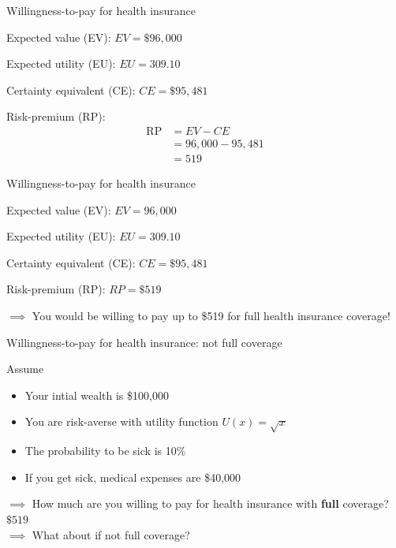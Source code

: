 \begin{frame}{Willingness-to-pay for health insurance}

    Expected value (EV): {\color{red}$EV =\$96,000$}
    \vspace{5mm}

    Expected utility (EU): {\color{red}$EU = 309.10$}
    \vspace{5mm}

    Certainty equivalent (CE): {\color{red}$CE = \$95,481$}
    \vspace{5mm}

    Risk-premium (RP):
    {\color{red}
    \begin{align*}
        \text{RP} &= EV - CE\\
        &= 96,000 - 95,481\\
        &= 519
    \end{align*}
    }

\end{frame}
\begin{frame}{Willingness-to-pay for health insurance}

    Expected value (EV): {\color{red}$EV =96,000$}
    \vspace{5mm}

    Expected utility (EU): {\color{red}$EU = 309.10$}
    \vspace{5mm}

    Certainty equivalent (CE): {\color{red}$CE = \$95,481$}
    \vspace{5mm}

    Risk-premium (RP): {\color{red}$RP = \$519$}
    \vspace{5mm}

    $\implies$ You would be willing to pay up to \$519 for full health insurance coverage!

\end{frame}
\begin{frame}{Willingness-to-pay for health insurance: not full coverage}

    Assume
    \begin{itemize}
        \item Your intial wealth is \$100,000
        \item You are risk-averse with utility function $U(x) = \sqrt{x}$
        \item The probability to be sick is 10\%
        \item If you get sick, medical expenses are \$40,000
    \end{itemize}
    \vspace{8mm}
    $\implies$ How much are you willing to pay for health insurance with \textbf{full} coverage? {\color{red}$\$519$}\\
    $\implies$ What about if not full coverage? 
\end{frame}
